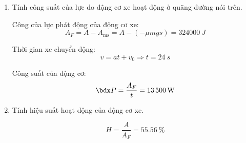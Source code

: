 \begin{enumerate}[label=\bfseries Câu \arabic*:]
{\begin{enumerate}[label=\alph*)]
		Tổng công các lực tác dụng lên xe:
		$$A=\Sigma F s = \SI{180000}{J}$$
		\item Tính công suất của lực do động cơ xe hoạt động ở quãng đường nói trên.
		
		Công của lực phát động của động cơ xe:
		$$A_F = A-A_\text{ms} = A- (-\mu mg s) = \SI{324000}{J}$$
		
		Thời gian xe chuyển động:
		$$v=at+v_0 \Rightarrow t = \SI{24}{s}$$
		
		Công suất của động cơ:
		$$\calP = \dfrac{A_F}{t} = \SI{13500}{W}$$
		\item Tính hiệu suất hoạt động của động cơ xe.
		
		$$H=\dfrac{A}{A_F} = \SI{55.56}{\percent}$$
	\end{enumerate}
}
\end{enumerate}

